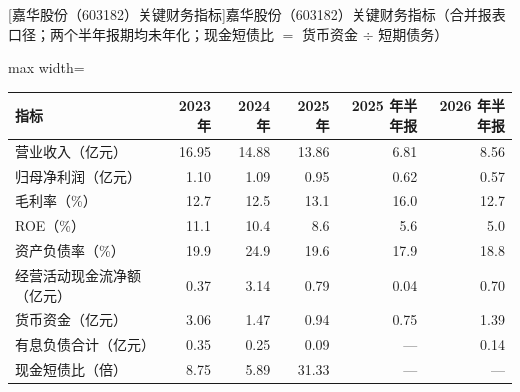 \begin{center}\small\setlength{\tabcolsep}{3.4pt}
[嘉华股份（603182）关键财务指标]{嘉华股份（603182）关键财务指标（合并报表口径；两个半年报期均未年化；现金短债比 $=$ 货币资金 $\div$ 短期债务）}
\begin{adjustbox}{max width=\textwidth}
\begin{tabular}{@{}lrrrrr@{}}
\toprule
指标 & 2023 年 & 2024 年 & 2025 年 & 2025 年半年报 & 2026 年半年报 \\
\midrule
营业收入（亿元） & 16.95 & 14.88 & 13.86 & 6.81 & 8.56 \\
归母净利润（亿元） & 1.10 & 1.09 & 0.95 & 0.62 & 0.57 \\
毛利率（\%） & 12.7 & 12.5 & 13.1 & 16.0 & 12.7 \\
ROE（\%） & 11.1 & 10.4 & 8.6 & 5.6 & 5.0 \\
资产负债率（\%） & 19.9 & 24.9 & 19.6 & 17.9 & 18.8 \\
经营活动现金流净额（亿元） & 0.37 & 3.14 & 0.79 & 0.04 & 0.70 \\
货币资金（亿元） & 3.06 & 1.47 & 0.94 & 0.75 & 1.39 \\
有息负债合计（亿元） & 0.35 & 0.25 & 0.09 & --- & 0.14 \\
现金短债比（倍） & 8.75 & 5.89 & 31.33 & --- & --- \\
\bottomrule
\end{tabular}
\end{adjustbox}
\end{center}

